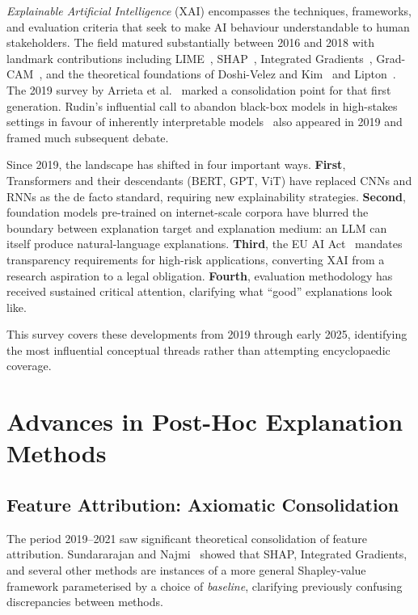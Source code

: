 \documentclass[12pt]{article}
\begin{document}
\emph{Explainable Artificial Intelligence} (XAI) encompasses the techniques,
frameworks, and evaluation criteria that seek to make AI behaviour understandable
to human stakeholders. The field matured substantially between 2016 and 2018 with
landmark contributions including LIME~\cite{ribeiro2016lime},
SHAP~\cite{lundberg2017shap}, Integrated Gradients~\cite{sundararajan2017integrated},
Grad-CAM~\cite{selvaraju2017gradcam}, and the theoretical foundations of
Doshi-Velez and Kim~\cite{doshivelez2017rigorous} and
Lipton~\cite{lipton2018mythos}. The 2019 survey by Arrieta et
al.~\cite{arrieta2020xai} marked a consolidation point for that first generation.
Rudin's influential call to abandon black-box models in high-stakes settings in
favour of inherently interpretable models~\cite{rudin2019stop} also appeared in
2019 and framed much subsequent debate.

Since 2019, the landscape has shifted in four important ways. \textbf{First},
Transformers and their descendants (BERT, GPT, ViT) have replaced CNNs and RNNs
as the de facto standard, requiring new explainability strategies. \textbf{Second},
foundation models pre-trained on internet-scale corpora have blurred the boundary
between explanation target and explanation medium: an LLM can itself produce
natural-language explanations. \textbf{Third}, the EU AI Act~\cite{euaiact2021}
mandates transparency requirements for high-risk applications, converting XAI from
a research aspiration to a legal obligation. \textbf{Fourth}, evaluation
methodology has received sustained critical attention, clarifying what ``good''
explanations look like.

This survey covers these developments from 2019 through early 2025, identifying
the most influential conceptual threads rather than attempting encyclopaedic
coverage.

\section{Advances in Post-Hoc Explanation Methods}
\label{sec:posthoc}

\subsection{Feature Attribution: Axiomatic Consolidation}

The period 2019--2021 saw significant theoretical consolidation of feature
attribution. Sundararajan and Najmi~\cite{sundararajan2020shapley} showed that
SHAP, Integrated Gradients, and several other methods are instances of a more
general Shapley-value framework parameterised by a choice of \emph{baseline},
clarifying previously confusing discrepancies between methods.
\end{document}
